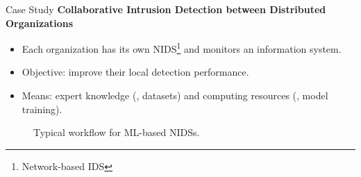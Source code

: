 


    





\begin{frame}{Case Study}
  \bigskip
  \textbf{Collaborative Intrusion Detection between Distributed Organizations}
  \begin{itemize}[<+->]
    \item Each organization has its own NIDS\footnote{Network-based IDS} and monitors an information system.
    \item Objective: improve their local detection performance.
    \item Means: \alert{expert knowledge} (\ie, datasets) and \alert{computing resources} (\ie, model training).
  \end{itemize}
  \medskip
  \pause
  \begin{figure}
    \centering
    \caption{Typical workflow for ML-based NIDSs.}
  \end{figure}
\end{frame}


